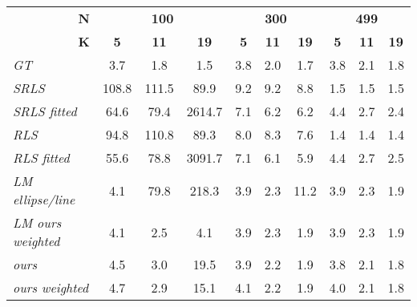 \begin{tabular}{l|ccc|ccc|ccc|}
\toprule
\multicolumn{1}{r|}{\textbf{N}} & \multicolumn{3}{c|}{\textbf{100}} & \multicolumn{3}{c|}{\textbf{300}} & \multicolumn{3}{c|}{\textbf{499}} \\
\multicolumn{1}{r|}{\textbf{K}} &   \textbf{5} &   \textbf{11}&    \textbf{19}& \textbf{5} & \textbf{11}&  \textbf{19}& \textbf{5} & \textbf{11}& \textbf{19}\\
\midrule
\textit{GT              } &   3.7 &   1.8 &    \cellcolor{\secondcolor}1.5 & 3.8 & 2.0 &  1.7 & 3.8 & 2.1 & 1.8 \\
\midrule \textit{SRLS            } & 108.8 & 111.5 &   89.9 & 9.2 & 9.2 &  8.8 & \cellcolor{\secondcolor}1.5 & \cellcolor{\secondcolor}1.5 & \cellcolor{\secondcolor}1.5 \\
\textit{SRLS fitted     } &  64.6 &  79.4 & 2614.7 & 7.1 & 6.2 &  6.2 & 4.4 & 2.7 & 2.4 \\
\textit{RLS             } &  94.8 & 110.8 &   89.3 & 8.0 & 8.3 &  7.6 & \cellcolor{\firstcolor}1.4 & \cellcolor{\firstcolor}1.4 & \cellcolor{\firstcolor}1.4 \\
\textit{RLS fitted      } &  55.6 &  78.8 & 3091.7 & 7.1 & 6.1 &  \cellcolor{\secondcolor}5.9 & 4.4 & 2.7 & \cellcolor{\firstcolor}2.5 \\
\textit{LM ellipse/line } &   \cellcolor{\firstcolor}4.1 &  79.8 &  218.3 & \cellcolor{\firstcolor}3.9 & \cellcolor{\secondcolor}2.3 & 11.2 & \cellcolor{\firstcolor}3.9 & \cellcolor{\secondcolor}2.3 & \cellcolor{\firstcolor}1.9 \\
\textit{LM ours weighted} &   \cellcolor{\firstcolor}4.1 &   \cellcolor{\firstcolor}2.5 &    \cellcolor{\firstcolor}4.1 & \cellcolor{\firstcolor}3.9 & \cellcolor{\secondcolor}2.3 &  \cellcolor{\firstcolor}1.9 & \cellcolor{\firstcolor}3.9 & \cellcolor{\secondcolor}2.3 & \cellcolor{\firstcolor}1.9 \\
\textit{ours            } &   \cellcolor{\secondcolor}4.5 &   3.0 &   19.5 & \cellcolor{\firstcolor}3.9 & \cellcolor{\firstcolor}2.2 &  \cellcolor{\firstcolor}1.9 & 3.8 & 2.1 & 1.8 \\
\textit{ours weighted   } &   4.7 &   \cellcolor{\secondcolor}2.9 &   \cellcolor{\secondcolor}15.1 & \cellcolor{\firstcolor}4.1 & \cellcolor{\firstcolor}2.2 &  \cellcolor{\firstcolor}1.9 & 4.0 & 2.1 & 1.8 \\
\bottomrule
\end{tabular}
